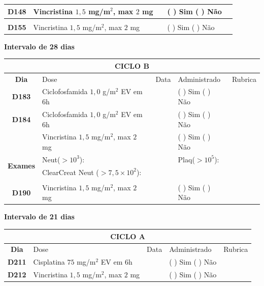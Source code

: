 \documentclass[11pt,a4paper,oldfontcommands]{memoir}
\begin{document}
\begin{center}
\begin{longtable}{p{1cm}p{6cm}|p{1cm}|p{3cm}|p{2.5cm}}
    \hline
    \multicolumn{1}{c|}{\multirow{1}{*}{\textbf{D148}}}&{Vincristina \(1,5\) mg/m\(^2\), max \(2\) mg}&&{(  ) Sim (  ) Não}&\\
    \hline
    \\
    \hline
    \multicolumn{1}{c|}{\multirow{1}{*}{\textbf{D155}}}&{Vincristina \(1,5\) mg/m\(^2\), max \(2\) mg}&&{(  ) Sim (  ) Não}&\\
    \hline
    \end{longtable}
    \textbf{Intervalo de 28 dias}
    \clearpage
    \begin{longtable}{p{1cm}p{6cm}|p{1cm}|p{3cm}|p{2.5cm}}
    \hline
	\multicolumn{5}{c}{\textbf{CICLO B}}\\
	\hline
    \multicolumn{1}{c|}{\multirow{1}{*}{\textbf{Dia}}}&{Dose}&{Data}&{Administrado}&{Rubrica} \\
    \hline
    \multicolumn{1}{c|}{\multirow{1}{*}{\textbf{D183}}}&{Ciclofosfamida \(1,0\) g/m\(^2\) EV em 6h}&&{(  ) Sim (  ) Não}&\\
    \multicolumn{1}{c|}{\multirow{1}{*}{\textbf{D184}}}&{Ciclofosfamida \(1,0\) g/m\(^2\) EV em 6h}&&{(  ) Sim (  ) Não}&\\
    \multicolumn{1}{c|}{\multirow{1}{*}{\textbf{}}}&{Vincristina \(1,5\) mg/m\(^2\), max \(2\) mg}&&{(  ) Sim (  ) Não}&\\
    \hline
    \multicolumn{1}{c|}{\multirow{2}{*}{\textbf{Exames}}}&\multicolumn{2}{l|}{Neut(\(>10^3\)):}&{Plaq(\(>10^5\)):}&\\
    \cline{2-5}
    \multicolumn{1}{c|}{\multirow{2}{*}{{}}}&\multicolumn{2}{l|}{ClearCreat Neut (\(>7,5\times10^2\)):}&{}&{}\\
    \hline
    \\
    \hline
    \multicolumn{1}{c|}{\multirow{1}{*}{\textbf{D190}}}&{Vincristina \(1,5\) mg/m\(^2\), max \(2\) mg}&&{(  ) Sim (  ) Não}&\\
    \hline
\end{longtable}
\textbf{Intervalo de 21 dias}
\begin{longtable}{p{1cm}p{6cm}|p{1cm}|p{3cm}|p{2.5cm}}
	\hline
	\multicolumn{5}{c}{\textbf{CICLO A}}\\
\hline
    \multicolumn{1}{c|}{\multirow{1}{*}{\textbf{Dia}}}&{Dose}&{Data}&{Administrado}&{Rubrica} \\
    \hline
    \multicolumn{1}{c|}{\multirow{1}{*}{\textbf{D211}}}&{Cisplatina \(75\) mg/m\(^2\) EV em 6h}&&{(  ) Sim (  ) Não}&\\
    \multicolumn{1}{c|}{\multirow{1}{*}{\textbf{D212}}}&{Vincristina \(1,5\) mg/m\(^2\), max \(2\) mg}&&{(  ) Sim (  ) Não}&\\

\end{longtable}
\end{center}
\end{document}
